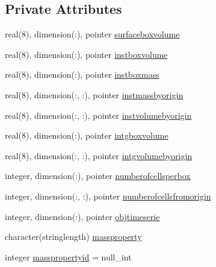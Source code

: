 \subsection*{Private Attributes}
\begin{DoxyCompactItemize}
\item 
real(8), dimension(\+:), pointer \mbox{\hyperlink{structmodulelagrangian_1_1t__monitorization_ab78805f0a59d5e731633addcc02041da}{surfaceboxvolume}}
\item 
real(8), dimension(\+:), pointer \mbox{\hyperlink{structmodulelagrangian_1_1t__monitorization_a4760b80c0c8b7a032c2790875a7f4142}{instboxvolume}}
\item 
real(8), dimension(\+:), pointer \mbox{\hyperlink{structmodulelagrangian_1_1t__monitorization_a8f59f0ad75e0d67a9faf50f56346e977}{instboxmass}}
\item 
real(8), dimension(\+:, \+:), pointer \mbox{\hyperlink{structmodulelagrangian_1_1t__monitorization_a33fd7795f601904933259c178a571584}{instmassbyorigin}}
\item 
real(8), dimension(\+:, \+:), pointer \mbox{\hyperlink{structmodulelagrangian_1_1t__monitorization_a0445eeef1406a130e9793292e3f39258}{instvolumebyorigin}}
\item 
real(8), dimension(\+:), pointer \mbox{\hyperlink{structmodulelagrangian_1_1t__monitorization_a0912d169724690322a40c07764c8c7af}{intgboxvolume}}
\item 
real(8), dimension(\+:, \+:), pointer \mbox{\hyperlink{structmodulelagrangian_1_1t__monitorization_ad2be0a7ae4f1074092e8ddf19265ca86}{intgvolumebyorigin}}
\item 
integer, dimension(\+:), pointer \mbox{\hyperlink{structmodulelagrangian_1_1t__monitorization_a920bf220bf693c96d85f8fb2781c9f21}{numberofcellsperbox}}
\item 
integer, dimension(\+:, \+:), pointer \mbox{\hyperlink{structmodulelagrangian_1_1t__monitorization_aee26238401314e9c0ef9c9c8d2b0cf50}{numberofcellsfromorigin}}
\item 
integer, dimension(\+:), pointer \mbox{\hyperlink{structmodulelagrangian_1_1t__monitorization_a692d04a4d6757e4fab7fc4d5170c871e}{objtimeserie}}
\item 
character(stringlength) \mbox{\hyperlink{structmodulelagrangian_1_1t__monitorization_aed50aa4953a370772494deaba5f67989}{massproperty}}
\item 
integer \mbox{\hyperlink{structmodulelagrangian_1_1t__monitorization_a18542359aebd0503aa6058bd1dfa471e}{masspropertyid}} = null\+\_\+int
\item 

\end{DoxyCompactItemize}
